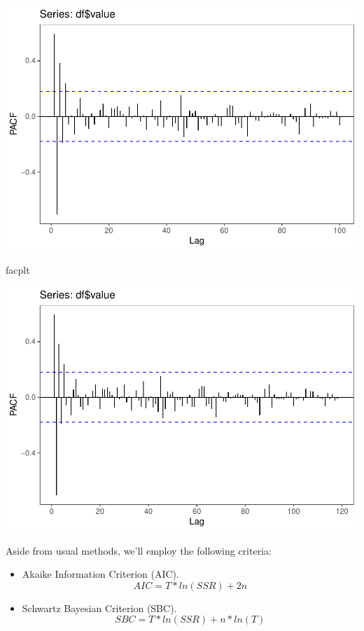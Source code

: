 \documentclass[11pt, a4paper]{report}
\newenvironment{Shaded}{\begin{snugshade}}{\end{snugshade}}
\newcommand{\NormalTok}[1]{#1}
\theoremstyle{plain}
\theoremstyle{plain}
\theoremstyle{remark}
\begin{document}
\begin{center}\includegraphics{Econo2_P3_files/figure-latex/plots-5} \end{center}

\begin{Shaded}
	\begin{Highlighting}[]
		\NormalTok{facplt}
	\end{Highlighting}
\end{Shaded}

\begin{center}\includegraphics{Econo2_P3_files/figure-latex/plots-6} \end{center}

Aside from usual methods, we'll employ the following criteria:

\begin{itemize}
	\item Akaike Information Criterion (AIC). 
	$$ AIC = T * ln(SSR) + 2n $$
	\item  Schwartz Bayesian Criterion (SBC).
	$$ SBC = T * ln(SSR) + n * ln(T) $$
\end{itemize}
\end{document}
